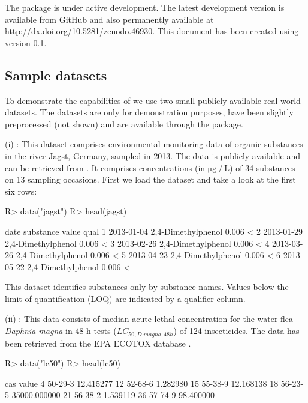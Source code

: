 \documentclass[article, shortnames]{jss}\usepackage[]{graphicx}\usepackage[]{color}
\begin{document}
The package is under active development. The latest development version is available from GitHub and also permanently available at \url{http://dx.doi.org/10.5281/zenodo.46930}.
This document has been created using  version 0.1.


\subsection[Sample datasets]{Sample datasets}
To demonstrate the capabilities of   we use two small publicly available real world datasets.
The datasets are only for demonstration purposes, have been slightly preprocessed (not shown) and are available through the package.

(i) : This dataset comprises environmental monitoring data of organic substances in the river Jagst, Germany, sampled in 2013.
The data is publicly available and can be retrieved from .
It comprises concentrations  (in $\mathrm{\mu g~/~L}$) of  34 substances  on 13 sampling occasions.
First we load the dataset and take a look at the first six rows:

\begin{CodeChunk}
\begin{CodeInput}
R> data("jagst")
R> head(jagst)
\end{CodeInput}
\begin{CodeOutput}
        date          substance value qual
1 2013-01-04 2,4-Dimethylphenol 0.006    <
2 2013-01-29 2,4-Dimethylphenol 0.006    <
3 2013-02-26 2,4-Dimethylphenol 0.006    <
4 2013-03-26 2,4-Dimethylphenol 0.006    <
5 2013-04-23 2,4-Dimethylphenol 0.006    <
6 2013-05-22 2,4-Dimethylphenol 0.006    <
\end{CodeOutput}
\end{CodeChunk}

This dataset identifies substances only by substance names. Values below the limit of quantification (LOQ) are indicated by a qualifier column.

(ii) : This data consists of median acute lethal concentration for the water flea \textit{Daphnia magna} in 48 h tests ($LC_{50, D.magna, 48h}$) of 124 insecticides.
The data has been retrieved from the EPA ECOTOX database \citep{epa_2016}.

\begin{CodeChunk}
\begin{CodeInput}
R> data("lc50")
R> head(lc50)
\end{CodeInput}
\begin{CodeOutput}
       cas        value
4  50-29-3    12.415277
12 52-68-6     1.282980
15 55-38-9    12.168138
18 56-23-5 35000.000000
21 56-38-2     1.539119
36 57-74-9    98.400000
\end{CodeOutput}
\end{CodeChunk}
\end{document}

